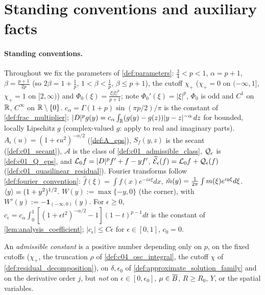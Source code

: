 
\section{Standing conventions and auxiliary facts}

\paragraph{Standing conventions.}
Throughout we fix the parameters of \cref{def:parameters}: $\frac34<p<1$, $\alpha=p+1$,
$\beta=\frac{p+1}{2p}$ (so $2\beta=1+\frac1p$, $1<\beta<\frac1p$, $\beta\le p+1$), the cutoff
$\chi_+$ ($\chi_+=0$ on $(-\infty,1]$, $\chi_+=1$ on $[2,\infty)$) and
$\Phi_0(\xi)=\frac{\xi|\xi|^p}{p+1}$; note $\Phi_0'(\xi)=|\xi|^p$, $\Phi_0$ is odd and $C^1$ on $\R$,
$C^\infty$ on $\R\setminus\{0\}$. $c_\alpha=\Gamma(1+p)\sin(\pi p/2)/\pi$ is the constant of
\cref{def:frac_multiplier}; $|D|^p g(y)=c_\alpha\int_\R(g(y)-g(z))|y-z|^{-\alpha}\,dz$ for bounded,
locally Lipschitz $g$ (complex-valued $g$: apply to real and imaginary parts).
$A_\epsilon(u)=(1+\epsilon u^2)^{-\alpha/2}$ (\cref{def:A_eps}), $S_f(y,z)$ is the secant
(\cref{def:c01_secant}), $\mathcal A$ is the class of \cref{def:c01_admissible_class},
$\mc Q_\epsilon$ is \cref{def:c01_Q_eps}, and $\mc L_0 f=|D|^pf'+f-yf'$,
$\sq{\mc E}_\epsilon(f)=\mc L_0 f+\mc Q_\epsilon(f)$ (\cref{def:c01_quasilinear_residual}).
Fourier transforms follow \cref{def:fourier_convention}: $\widehat f(\xi)=\int f(x)e^{-ix\xi}dx$,
$\widecheck m(y)=\frac1{2\pi}\int m(\xi)e^{iy\xi}d\xi$. $\ang y=(1+y^2)^{1/2}$.
$W(y):=\max\{-y,0\}$ (the corner), with $W'(y):=-\mathbf 1_{(-\infty,0)}(y)$.
For $\epsilon\ge0$, $c_\epsilon=c_\alpha\int_0^1[(1+\epsilon t^2)^{-\alpha/2}-1](1-t)^{p-1}dt$ is the
constant of \cref{lem:analysis_coefficient}; $|c_\epsilon|\le C\epsilon$ for $\epsilon\in[0,1]$, $c_0=0$.

An \emph{admissible constant} is a positive number depending only on $p$, on the fixed cutoffs
($\chi_+$, the truncation $\rho$ of \cref{def:c04_osc_integral}, the cutoff $\chi$ of
\cref{def:residual_decomposition}), on $\delta,\epsilon_0$ of \cref{def:approximate_solution_family}
and on the derivative order $j$, but \emph{not} on $\epsilon\in[0,\epsilon_0]$, $\mu\in\ov B$,
$R\ge R_0$, $Y$, or the spatial variables.

